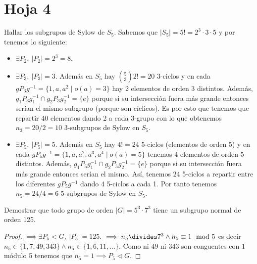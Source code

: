 \documentclass{book}
\theoremstyle{definition}
\theoremstyle{remark}
\newcommand{\normsub}{\mathbin{\triangleleft}}
\newcommand{\inv}[1]{#1^{-1}}
\begin{document}
\section{Hoja 4}

\begin{ex}[H4.11] Hallar los subgrupos de Sylow de $S_5$.
	Sabemos que $|S_5| = 5! = 2^3\cdot3\cdot 5$ y por  tenemos lo siguiente:
	\begin{itemize}
		\item $\exists P_2,\ |P_2| = 2^3 = 8$.
		\item $\exists P_3,\ |P_3| = 3$. Además en $S_5$ hay $\binom{5}{3}2! =20 $ 3-ciclos y en cada $gP_3\inv{g} = \{1, a, a^2 \mid o(a) = 3\}$ hay 2 elementos de orden 3 distintos. Además, $g_1P_3\inv{g_1} \cap g_2P_3\inv{g_2} = \{e\}$ porque si su intersección fuera más grande entonces serían el mismo subgrupo (porque son cíclicos). Es por esto que tenemos que repartir 40 elementos dando 2 a cada 3-grupo con lo que obtenemos $n_3 = 20 / 2 = 10$ 3-subgrupos de Sylow en $S_5$.
		\item $\exists P_5,\ |P_5| = 5$. Además en $S_5$ hay $4! = 24$ 5-ciclos (elementos de orden 5) y en cada $gP_5\inv{g} = \{1, a, a^2, a^3, a^4 \mid o(a) = 5\}$ tenemos $4$ elementos de orden $5$ distintos. Además, $g_1P_5\inv{g_1} \cap g_2P_5\inv{g_2} = \{e\}$ porque si su intersección fuera más grande entonces serían el mismo. Así, tenemos $24$ 5-ciclos a repartir entre los diferentes $gP_5\inv{g}$ dando 4 5-ciclos a cada 1. Por tanto tenemos $n_5 = 24/4 = 6$ 5-subgrupos de Sylow en $S_5$.
	\end{itemize}
\end{ex}

\begin{ex}[H4.18]
	Demostrar que todo grupo de orden $|G| = 5^3 \cdot 7^3$ tiene un subgrupo normal de orden 125.
	
	\begin{proof}
		 $\implies \exists P_5 < G,\ |P_5| = 125$.  $\implies n_5 \divides 7^3 \land n_5 \equiv 1 \mod 5$ es decir $n_5 \in \{1, 7, 49, 343\} \land n_5 \in \{1, 6, 11, \dots\}$. Como ni $49$ ni $343$ son conguentes con $1$ módulo 5 tenemos que $n_5 = 1 \implies P_5 \normsub G$.
	\end{proof}
\end{ex}
\end{document}
